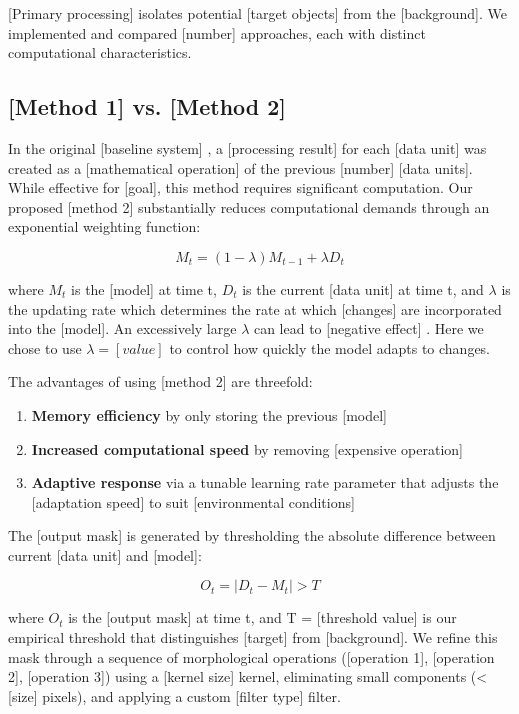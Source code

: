 [Primary processing] isolates potential [target objects] from the [background]. We implemented and compared [number] approaches, each with distinct computational characteristics.

\subsection{[Method 1] vs. [Method 2]}

In the original [baseline system] \cite{haynes2016crc}, a [processing result] for each [data unit] was created as a [mathematical operation] of the previous [number] [data units]. While effective for [goal], this method requires significant computation. Our proposed [method 2] substantially reduces computational demands through an exponential weighting function:

\begin{equation}
M_t = (1 - \lambda)M_{t-1} + \lambda D_t
\label{eq:method_equation}
\end{equation}

where $M_t$ is the [model] at time t, $D_t$ is the current [data unit] at time t, and $\lambda$ is the updating rate which determines the rate at which [changes] are incorporated into the [model]. An excessively large $\lambda$ can lead to [negative effect] \cite{haynes2016crc}. Here we chose to use $\lambda = [value]$ to control how quickly the model adapts to changes.

The advantages of using [method 2] are threefold:
\begin{enumerate}
\item \textbf{Memory efficiency} by only storing the previous [model]
\item \textbf{Increased computational speed} by removing [expensive operation]
\item \textbf{Adaptive response} via a tunable learning rate parameter that adjusts the [adaptation speed] to suit [environmental conditions]
\end{enumerate}

The [output mask] is generated by thresholding the absolute difference between current [data unit] and [model]:

\begin{equation}
O_t = |D_t - M_t| > T
\label{eq:output_mask}
\end{equation}

where $O_t$ is the [output mask] at time t, and T = [threshold value] is our empirical threshold that distinguishes [target] from [background]. We refine this mask through a sequence of morphological operations ([operation 1], [operation 2], [operation 3]) using a [kernel size] kernel, eliminating small components (< [size] pixels), and applying a custom [filter type] filter.

